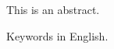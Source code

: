 \newpage
\section*{}
This is an abstract.

\vspace{0.5cm}\vspace{2.2cm}
{}

\vspace{0.8cm}
Keywords in English.
\cleardoublepage